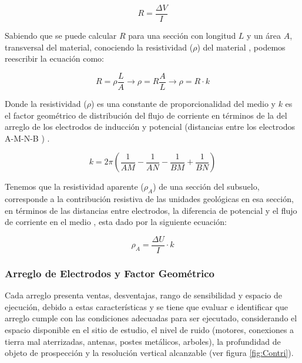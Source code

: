 			\begin{equation}
				R = \frac{\Delta V}{I}
			\end{equation}
			   
			Sabiendo que se puede calcular $R$ para una sección con longitud $L$ y un área $A$, transversal del material, conociendo la resistividad ($\rho$) del material \citep{igboama2023, lowrie2020}, podemos reescribir la ecuación como: 
			
			\begin{equation}
				R = \rho \frac{L}{A}  \rightarrow  	\rho  = R \frac{A}{L} \rightarrow \rho  = R \cdot k
			\end{equation}
			
			Donde la resistividad ($\rho$) es una constante de proporcionalidad del medio y $k$ es el factor geométrico de distribución del flujo de corriente en términos de la del arreglo  de los electrodos de inducción y potencial (distancias entre los electrodos A-M-N-B ) \citep{igboama2023, lowrie2020}.
			
			\begin{equation}
				k = 2\pi \left(  \dfrac{1}{AM} - \dfrac{1}{AN} - \dfrac{1}{BM} + \dfrac{1}{BN} \right) 
			\end{equation}
			
			Tenemos que la resistividad aparente ($\rho _{A}$) de una sección del subsuelo, corresponde a la contribución resistiva de las unidades geológicas en esa sección, en términos de las distancias entre electrodos, la diferencia de potencial y el flujo de corriente en el medio \citep{igboama2023, lowrie2020}, esta dado por la siguiente ecuación:
			
			\begin{equation}
				\rho_{A} = \frac{\Delta U}{I} \cdot k %
			\end{equation}
			
			\subsubsection{Arreglo de Electrodos y Factor Geométrico}
			
				Cada arreglo presenta ventas, desventajas, rango de sensibilidad y espacio de ejecución, debido a estas características y se tiene que evaluar e identificar que arreglo cumple con las condiciones adecuadas para ser ejecutado, considerando el espacio disponible en el sitio de estudio, el nivel de ruido (motores, conexiones a tierra mal aterrizadas, antenas, postes metálicos, arboles), la profundidad de objeto de prospección y la resolución vertical alcanzable (ver figura \ref{fig:Contri}).
				
